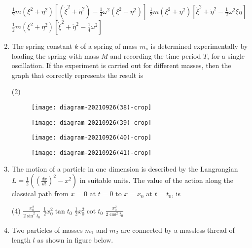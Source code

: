 \begin{enumerate}
\begin{tasks}
		\task[\textbf{B.}] $\frac{1}{2} m\left(\xi^{2}+\eta^{2}\right)\left[\left(\dot{\xi}^{2}+\dot{\eta}^{2}\right)-\frac{1}{4} \omega^{2}\left(\xi^{2}+\eta^{2}\right)\right]$
		\task[\textbf{C.}] $\frac{1}{2} m\left(\xi^{2}+\eta^{2}\right)\left[\dot{\xi}^{2}+\dot{\eta}^{2}-\frac{1}{2} \omega^{2} \xi \eta\right]$
		\task[\textbf{D.}] $\frac{1}{2} m\left(\xi^{2}+\eta^{2}\right)\left[\dot{\xi}^{2}+\dot{\eta}^{2}-\frac{1}{4} \omega^{2}\right]$
	\end{tasks}	
	\item The spring constant $k$ of a spring of mass $m_{s}$ is determined experimentally by loading the spring with mass $M$ and recording the time period $T$, for a single oscillation. If the experiment is carried out for different masses, then the graph that correctly represents the result is
	{}
	\begin{tasks}(2)
		\task[\textbf{A.}] \begin{figure}[H]
			\centering
			\texttt{[image: diagram-20210926(38)-crop]}
		\end{figure}
		\task[\textbf{B.}] \begin{figure}[H]
			\centering
			\texttt{[image: diagram-20210926(39)-crop]}
		\end{figure}
		\task[\textbf{C.}] \begin{figure}[H]
			\centering
			\texttt{[image: diagram-20210926(40)-crop]}
		\end{figure}
		\task[\textbf{D.}] \begin{figure}[H]
			\centering
			\texttt{[image: diagram-20210926(41)-crop]}
		\end{figure}
	\end{tasks}	
	\item The motion of a particle in one dimension is described by the Langrangian $L=\frac{1}{2}\left(\left(\frac{d x}{d t}\right)^{2}-x^{2}\right)$ in suitable units. The value of the action along the classical path from $x=0$ at $t=0$ to $x=x_{0}$ at $t=t_{0}$, is
	{}
	\begin{tasks}(4)
		\task[\textbf{A.}] $\frac{x_{0}^{2}}{2 \sin ^{2} t_{0}}$
		\task[\textbf{B.}] $\frac{1}{2} x_{0}^{2} \tan t_{0}$
		\task[\textbf{C.}] $\frac{1}{2} x_{0}^{2} \cot t_{0}$
		\task[\textbf{D.}] $\frac{x_{0}^{2}}{2 \cos ^{2} t_{0}}$
	\end{tasks}	
	\item Two particles of masses $m_{1}$ and $m_{2}$ are connected by a massless thread of length $l$ as shown in figure below.\\

\end{enumerate}
